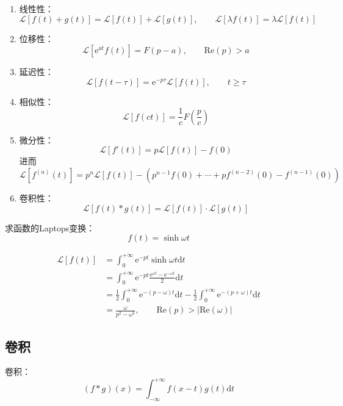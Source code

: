 \documentclass[lang = cn, scheme = chinese, thmcnt = section]{elegantbook}
\newcommand{\dd}{\mathrm{d}}           %
\newcommand{\ee}[1]{\mathrm{e}^{#1}}   %
\begin{document}
\begin{property}
	\begin{enumerate}
		\item 线性性：%
		$$
		\mathscr{L}[f(t)+g(t)]=\mathscr{L}[f(t)]+\mathscr{L}[g(t)],\qquad 
		\mathscr{L}[\lambda f(t)]=\lambda \mathscr{L}[f(t)]
		$$
		\item 位移性：%
		$$
		\mathscr{L}[\ee{at}f(t)]=F(p-a),\qquad \text{Re}(p)>a
		$$
		\item 延迟性：%
		$$
		\mathscr{L}[f(t-\tau)]=\ee{-p\tau}\mathscr{L}[f(t)],\qquad t\ge \tau
		$$
		\item 相似性：%
		$$
		\mathscr{L}[f(ct)]=\frac{1}{c}F\left(\frac{p}{c}\right)
		$$
		\item 微分性：%
		$$
		\mathscr{L}[f'(t)]=p\mathscr{L}[f(t)]-f(0)
		$$
		进而%
		$$
		\mathscr{L}[f^{(n)}(t)]
		=p^n\mathscr{L}[f(t)]-(p^{n-1}f(0)+\cdots+pf^{(n-2)}(0)-f^{(n-1)}(0))
		$$
		\item 卷积性：%
		$$
		\mathscr{L}[f(t)*g(t)]=\mathscr{L}[f(t)]\cdot\mathscr{L}[g(t)]
		$$
	\end{enumerate}
\end{property}

\begin{example}
	求函数的Laptops变换：
	$$
	f(t)=\sinh \omega t
	$$
\end{example}

\begin{solution}
	\begin{align*}
		\mathscr{L}[f(t)]
		& = \int_{0}^{+\infty}\text{e}^{-pt}\sinh \omega t\dd t\\
		& = \int_{0}^{+\infty}\text{e}^{-pt}\frac{\text{e}^{\omega t}-\text{e}^{-\omega t}}{2}\dd t\\
		& = \frac{1}{2}\int_{0}^{+\infty}\text{e}^{-(p-\omega)t}\dd t
		-\frac{1}{2}\int_{0}^{+\infty}\text{e}^{-(p+\omega)t}\dd t\\
		& = \frac{\omega}{p^2-\omega^2},\qquad \text{Re}(p)>|\text{Re}(\omega)|
	\end{align*}
\end{solution}

\subsection{卷积}

\begin{note}
	卷积：%
	$$
	(f*g)(x)=\int_{-\infty}^{+\infty}f(x-t)g(t)\dd t
	$$
\end{note}
\end{document}
